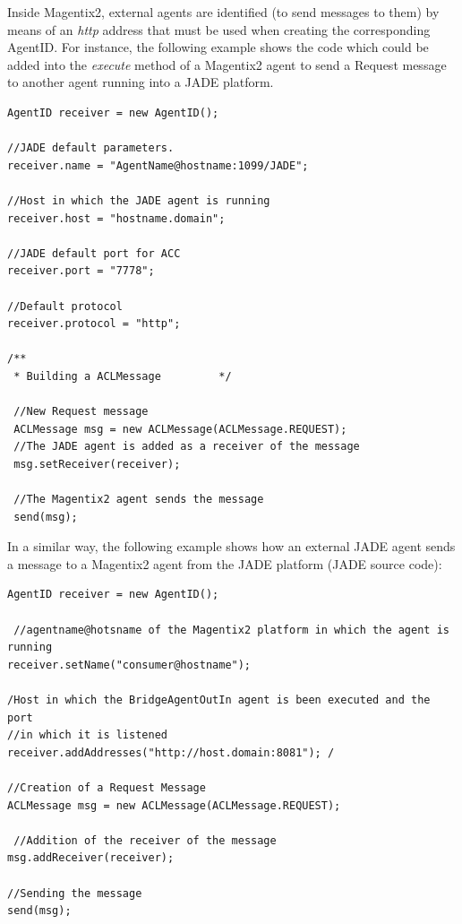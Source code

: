 %
%




Inside Magentix2, external agents are identified (to send messages to them) by means of an \textit{http} address that must be used when creating the corresponding AgentID. For instance, the following example shows the code which could be added into the \textit{execute} method of a Magentix2 agent to send a Request message to another agent running into a JADE platform.

\begin{lstlisting}
AgentID receiver = new AgentID();

//JADE default parameters.
receiver.name = "AgentName@hostname:1099/JADE";

//Host in which the JADE agent is running
receiver.host = "hostname.domain";

//JADE default port for ACC
receiver.port = "7778";

//Default protocol
receiver.protocol = "http";

/**
 * Building a ACLMessage         */

 //New Request message
 ACLMessage msg = new ACLMessage(ACLMessage.REQUEST);
 //The JADE agent is added as a receiver of the message
 msg.setReceiver(receiver);

 //The Magentix2 agent sends the message
 send(msg);
\end{lstlisting}

In a similar way, the following example shows how an external JADE agent sends a message to a Magentix2 agent from the JADE platform (JADE source code):


\begin{lstlisting}
AgentID receiver = new AgentID();

 //agentname@hotsname of the Magentix2 platform in which the agent is running
receiver.setName("consumer@hostname");

/Host in which the BridgeAgentOutIn agent is been executed and the port
//in which it is listened
receiver.addAddresses("http://host.domain:8081"); /

//Creation of a Request Message
ACLMessage msg = new ACLMessage(ACLMessage.REQUEST);

 //Addition of the receiver of the message
msg.addReceiver(receiver);

//Sending the message
send(msg);
\end{lstlisting}

